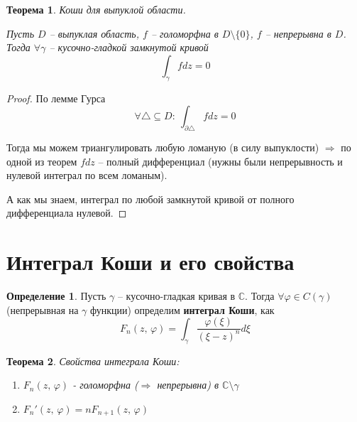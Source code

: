 \documentclass[a4paper,12pt]{article}
\renewcommand{\phi}{\ensuremath{\varphi}}
\theoremstyle{plain}
\newtheorem{theorem}{Теорема}[section]
\theoremstyle{definition}
\newtheorem{definition}{Определение}[section]
\theoremstyle{remark}
\begin{document}
\begin{theorem}
	Коши для выпуклой области.

	Пусть $D$ -- выпуклая область, $f$ -- голоморфна в $D \setminus \{0\}$, $f$ -- непрерывна в $D$. Тогда $\forall \gamma$ -- кусочно-гладкой замкнутой кривой
	\[
		\int_\gamma fdz = 0
	\]
\end{theorem}

\begin{proof}
	По лемме Гурса
	\[
		\forall \triangle \subseteq D :\: \int_{\partial \triangle} fdz = 0
	\]

	Тогда мы можем триангулировать любую ломаную (в силу выпуклости) $\Rightarrow$ по одной из теорем $fdz$ -- полный дифференциал (нужны были непрерывность и нулевой интеграл по всем ломаным).

	А как мы знаем, интеграл по любой замкнутой кривой от полного дифференциала нулевой.
\end{proof}

\section{Интеграл Коши и его свойства}
\begin{definition}
	Пусть $\gamma$ -- кусочно-гладкая кривая в $\mathbb{C}$. Тогда $\forall \phi \in C(\gamma)$ (непрерывная на $\gamma$ функции) определим \textbf{интеграл Коши}, как
	\[
		F_n(z,\, \phi) = \int_\gamma \frac{\phi(\xi)}{(\xi - z)^n}d\xi
	\]
\end{definition}

\begin{theorem}
	Свойства интеграла Коши:
	\begin{enumerate}
		\item $F_n(z,\, \phi)$ - голоморфна ($\Rightarrow$ непрерывна) в $\mathbb{C} \setminus \gamma$
		\item $F_n'(z,\, \phi) = nF_{n + 1}(z,\, \phi)$
	\end{enumerate}
\end{theorem}
\end{document}
